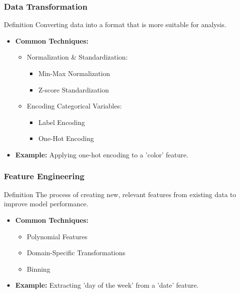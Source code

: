 \documentclass[aspectratio=169]{beamer}
\begin{document}
\begin{frame}[fragile]
    \frametitle{Data Transformation}
    \begin{block}{Definition}
        Converting data into a format that is more suitable for analysis.
    \end{block}
    \begin{itemize}
        \item \textbf{Common Techniques:}
            \begin{itemize}
                \item Normalization & Standardization:
                    \begin{itemize}
                        \item Min-Max Normalization
                        \item Z-score Standardization
                    \end{itemize}
                \item Encoding Categorical Variables:
                    \begin{itemize}
                        \item Label Encoding
                        \item One-Hot Encoding
                    \end{itemize}
            \end{itemize}
        \item \textbf{Example:} Applying one-hot encoding to a 'color' feature.
    \end{itemize}
\end{frame}

\begin{frame}[fragile]
    \frametitle{Feature Engineering}
    \begin{block}{Definition}
        The process of creating new, relevant features from existing data to improve model performance.
    \end{block}
    \begin{itemize}
        \item \textbf{Common Techniques:}
            \begin{itemize}
                \item Polynomial Features
                \item Domain-Specific Transformations
                \item Binning
            \end{itemize}
        \item \textbf{Example:} Extracting 'day of the week' from a 'date' feature.
    \end{itemize}
\end{frame}
\end{document}
